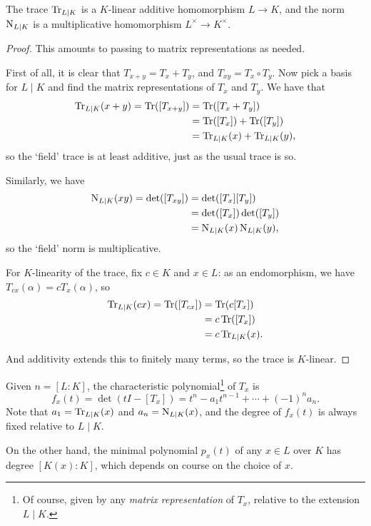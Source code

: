 \begin{prop}
	The trace $\operatorname{Tr}_{L\mid K}$ is a $K$-linear additive homomorphism $L\to K$, and the norm $\operatorname{N}_{L\mid K}$ is a multiplicative homomorphism $L^\times\to K^\times$.
\end{prop}
\begin{proof}
	This amounts to passing to matrix representations as needed.

	First of all, it is clear that $T_{x+y}=T_x+T_y$, and $T_{xy}=T_x\circ T_y$. Now pick a basis for $L\mid K$ and find the matrix representations of $T_x$ and $T_y$. We have that
	\begin{align*}
		\operatorname{Tr}_{L\mid K}(x+y)=\operatorname{Tr}([T_{x+y}])&=\operatorname{Tr}([T_x+T_y])\\
			&=\operatorname{Tr}([T_x])+\operatorname{Tr}([T_y])\\
			&= \operatorname{Tr}_{L\mid K}(x)+\operatorname{Tr}_{L\mid K}(y),
	\end{align*}
	so the `field' trace is at least additive, just as the usual trace is so.

	Similarly, we have
	\begin{align*}
		\operatorname{N}_{L\mid K}(xy) = \det([T_{xy}]) &= \det([T_x][T_y])\\
			&= \det([T_x])\det([T_y])\\
			&= \operatorname{N}_{L\mid K}(x)\operatorname{N}_{L\mid K}(y),
	\end{align*}
	so the `field' norm is multiplicative.

	For $K$-linearity of the trace, fix $c\in K$ and $x\in L$: as an endomorphism, we have $T_{cx}(\alpha)=c T_x(\alpha)$, so
	\begin{align*}
		\operatorname{Tr}_{L\mid K}(cx) = \operatorname{Tr}([T_{cx}]) &= \operatorname{Tr}(c[T_x])\\
			&= c\operatorname{Tr}([T_x])\\
			&= c \operatorname{Tr}_{L\mid K}(x).
	\end{align*}

	And additivity extends this to finitely many terms, so the trace is $K$-linear.
\end{proof}




Given $n=[L : K]$, the characteristic polynomial\footnote{Of course, given by any \emph{matrix representation} of $T_x$, relative to the extension $L\mid K$.} of $T_x$ is
\[
	f_x(t) = \det(tI - [T_x]) = t^n - a_1t^{n-1} + \cdots + (-1)^na_n.
\]
Note that $a_1=\operatorname{Tr}_{L\mid K}(x)$ and $a_n=\operatorname{N}_{L\mid K}(x)$, and the degree of $f_x(t)$ is always fixed relative to $L\mid K$.

On the other hand, the minimal polynomial $p_x(t)$ of any $x\in L$ over $K$ has degree $[K(x) : K]$, which depends on course on the choice of $x$.



